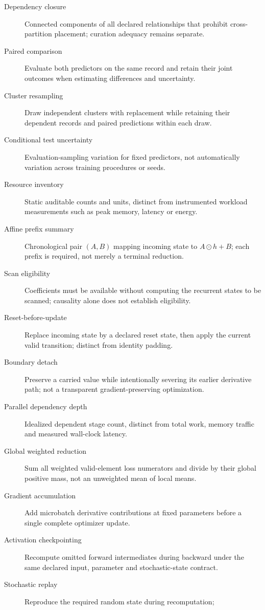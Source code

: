 \begin{description}
\item[Dependency closure] Connected components of all declared relationships
that prohibit cross-partition placement; curation adequacy remains separate.
\item[Paired comparison] Evaluate both predictors on the same record and retain
their joint outcomes when estimating differences and uncertainty.
\item[Cluster resampling] Draw independent clusters with replacement while
retaining their dependent records and paired predictions within each draw.
\item[Conditional test uncertainty] Evaluation-sampling variation for fixed
predictors, not automatically variation across training procedures or seeds.
\item[Resource inventory] Static auditable counts and units, distinct from
instrumented workload measurements such as peak memory, latency or energy.
\item[Affine prefix summary] Chronological pair $(A,B)$ mapping incoming state
to $A\odot h+B$; each prefix is required, not merely a terminal reduction.
\item[Scan eligibility] Coefficients must be available without computing the
recurrent states to be scanned; causality alone does not establish eligibility.
\item[Reset-before-update] Replace incoming state by a declared reset state,
then apply the current valid transition; distinct from identity padding.
\item[Boundary detach] Preserve a carried value while intentionally severing its
earlier derivative path; not a transparent gradient-preserving optimization.
\item[Parallel dependency depth] Idealized dependent stage count, distinct from
total work, memory traffic and measured wall-clock latency.
\item[Global weighted reduction] Sum all weighted valid-element loss numerators
and divide by their global positive mass, not an unweighted mean of local means.
\item[Gradient accumulation] Add microbatch derivative contributions at fixed
parameters before a single complete optimizer update.
\item[Activation checkpointing] Recompute omitted forward intermediates during
backward under the same declared input, parameter and stochastic-state contract.
\item[Stochastic replay] Reproduce the required random state during recomputation;

\end{description}
